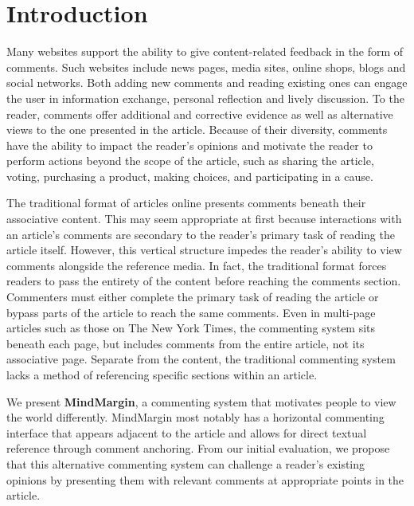 \section{Introduction}

Many websites support the ability to give content-related feedback in the form of comments. Such websites include news pages, media sites, online shops, blogs and social networks. Both adding new comments and reading existing ones can engage the user in information exchange, personal reflection and lively discussion. To the reader, comments offer additional and corrective evidence as well as alternative views to the one presented in the article. Because of their diversity, comments have the ability to impact the reader's opinions and motivate the reader to perform actions beyond the scope of the article, such as sharing the article, voting, purchasing a product, making choices, and participating in a cause. 

The traditional format of articles online presents comments beneath their associative content. This may seem appropriate at first because interactions with an article's comments are secondary to the reader's primary task of reading the article itself. However, this vertical structure impedes the reader's ability to view comments alongside the reference media. In fact, the traditional format forces readers to pass the entirety of the content before reaching the comments section. Commenters must either complete the primary task of reading the article or bypass parts of the article to reach the same comments. Even in multi-page articles such as those on The New York Times, the commenting system sits beneath each page, but includes comments from the entire article, not its associative page. Separate from the content, the traditional commenting system lacks a method of referencing specific sections within an article.

We present \textbf{MindMargin}, a commenting system that motivates people to view the world differently. MindMargin most notably has a horizontal commenting interface that appears adjacent to the article and allows for direct textual reference through comment anchoring. From our initial evaluation, we propose that this alternative commenting system can challenge a reader's existing opinions by presenting them with relevant comments at appropriate points in the article. 

